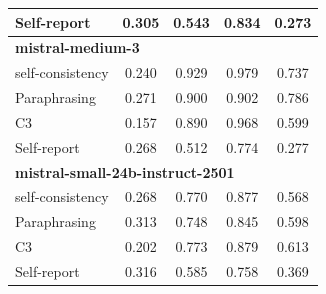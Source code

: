 \documentclass[11pt]{article}
\theoremstyle{plain}
\theoremstyle{definition}
\theoremstyle{remark}
\begin{document}
\begin{table}[p]
\begin{minipage}[t]{0.48\textwidth}
\begin{tabular}{lcccc}
        Self-report      & 0.305 & 0.543 & 0.834 & 0.273 \\
        \midrule
        \multicolumn{5}{l}{\textbf{mistral-medium-3}} \\
        self-consistency & 0.240 & 0.929 & 0.979 & 0.737 \\
        Paraphrasing     & 0.271 & 0.900 & 0.902 & 0.786 \\
       C3             & 0.157 & 0.890 & 0.968 & 0.599 \\
        Self-report      & 0.268 & 0.512 & 0.774 & 0.277 \\
        \midrule
        \multicolumn{5}{l}{\textbf{mistral-small-24b-instruct-2501}} \\
        self-consistency & 0.268 & 0.770 & 0.877 & 0.568 \\
        Paraphrasing     & 0.313 & 0.748 & 0.845 & 0.598 \\
       C3             & 0.202 & 0.773 & 0.879 & 0.613 \\
        Self-report      & 0.316 & 0.585 & 0.758 & 0.369 \\
        \bottomrule
    \end{tabular}
\end{minipage}
\end{table}
\end{document}
